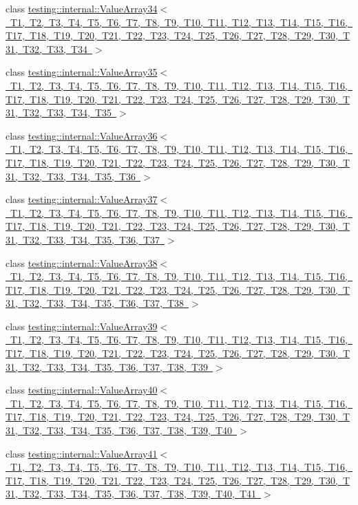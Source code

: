 \begin{DoxyCompactItemize}
\item 
class \mbox{\hyperlink{classtesting_1_1internal_1_1_value_array34}{testing\+::internal\+::\+Value\+Array34$<$ T1, T2, T3, T4, T5, T6, T7, T8, T9, T10, T11, T12, T13, T14, T15, T16, T17, T18, T19, T20, T21, T22, T23, T24, T25, T26, T27, T28, T29, T30, T31, T32, T33, T34 $>$}}
\item 
class \mbox{\hyperlink{classtesting_1_1internal_1_1_value_array35}{testing\+::internal\+::\+Value\+Array35$<$ T1, T2, T3, T4, T5, T6, T7, T8, T9, T10, T11, T12, T13, T14, T15, T16, T17, T18, T19, T20, T21, T22, T23, T24, T25, T26, T27, T28, T29, T30, T31, T32, T33, T34, T35 $>$}}
\item 
class \mbox{\hyperlink{classtesting_1_1internal_1_1_value_array36}{testing\+::internal\+::\+Value\+Array36$<$ T1, T2, T3, T4, T5, T6, T7, T8, T9, T10, T11, T12, T13, T14, T15, T16, T17, T18, T19, T20, T21, T22, T23, T24, T25, T26, T27, T28, T29, T30, T31, T32, T33, T34, T35, T36 $>$}}
\item 
class \mbox{\hyperlink{classtesting_1_1internal_1_1_value_array37}{testing\+::internal\+::\+Value\+Array37$<$ T1, T2, T3, T4, T5, T6, T7, T8, T9, T10, T11, T12, T13, T14, T15, T16, T17, T18, T19, T20, T21, T22, T23, T24, T25, T26, T27, T28, T29, T30, T31, T32, T33, T34, T35, T36, T37 $>$}}
\item 
class \mbox{\hyperlink{classtesting_1_1internal_1_1_value_array38}{testing\+::internal\+::\+Value\+Array38$<$ T1, T2, T3, T4, T5, T6, T7, T8, T9, T10, T11, T12, T13, T14, T15, T16, T17, T18, T19, T20, T21, T22, T23, T24, T25, T26, T27, T28, T29, T30, T31, T32, T33, T34, T35, T36, T37, T38 $>$}}
\item 
class \mbox{\hyperlink{classtesting_1_1internal_1_1_value_array39}{testing\+::internal\+::\+Value\+Array39$<$ T1, T2, T3, T4, T5, T6, T7, T8, T9, T10, T11, T12, T13, T14, T15, T16, T17, T18, T19, T20, T21, T22, T23, T24, T25, T26, T27, T28, T29, T30, T31, T32, T33, T34, T35, T36, T37, T38, T39 $>$}}
\item 
class \mbox{\hyperlink{classtesting_1_1internal_1_1_value_array40}{testing\+::internal\+::\+Value\+Array40$<$ T1, T2, T3, T4, T5, T6, T7, T8, T9, T10, T11, T12, T13, T14, T15, T16, T17, T18, T19, T20, T21, T22, T23, T24, T25, T26, T27, T28, T29, T30, T31, T32, T33, T34, T35, T36, T37, T38, T39, T40 $>$}}
\item 
class \mbox{\hyperlink{classtesting_1_1internal_1_1_value_array41}{testing\+::internal\+::\+Value\+Array41$<$ T1, T2, T3, T4, T5, T6, T7, T8, T9, T10, T11, T12, T13, T14, T15, T16, T17, T18, T19, T20, T21, T22, T23, T24, T25, T26, T27, T28, T29, T30, T31, T32, T33, T34, T35, T36, T37, T38, T39, T40, T41 $>$}}

\end{DoxyCompactItemize}
